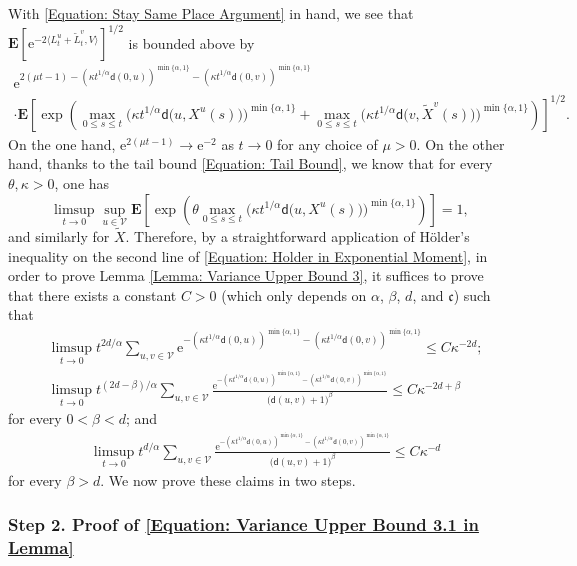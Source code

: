 \documentclass{amsart}
\numberwithin{equation}{section}
\theoremstyle{definition}
\newcommand\al{\alpha}
\newcommand\be{\beta}
\newcommand\ka{\kappa}
\newcommand\mbf{\mathbf}
\newcommand\mf{\mathfrak}
\newcommand\mr{\mathrm}
\newcommand\ms{\mathscr}
\newcommand\msf{\mathsf}
\begin{document}
%

With \eqref{Equation: Stay Same Place Argument} in hand, we see that $\mbf E[\mr e^{-2\langle L^u_t+\tilde L^v_t,V\rangle}]^{1/2}$
is bounded above by
\begin{multline}
\label{Equation: Holder in Exponential Moment}
\mr e^{2(\mu t-1)-(\ka t^{1/\al}\msf d(0,u))^{\min\{\al,1\}}-(\ka t^{1/\al}\msf d(0,v))^{\min\{\al,1\}}}\\
\cdot\mbf E\left[\exp\left(\max_{0\leq s\leq t}\Big(\ka t^{1/\al}\msf d\big(u,X^u(s)\big)\Big)^{\min\{\al,1\}}+\max_{0\leq s\leq t}\Big(\ka t^{1/\al}\msf d\big(v,\tilde X^v(s)\big)\Big)^{\min\{\al,1\}}\right)\right]^{1/2}.
\end{multline}
On the one hand, $\mr e^{2(\mu t-1)}\to\mr e^{-2}$ as $t\to0$ for any choice of $\mu>0$. On the other hand,
thanks to the tail bound \eqref{Equation: Tail Bound}, we know that for every $\theta,\ka>0$, one has
\[\limsup_{t\to0}\sup_{u\in\ms V}\mbf E\left[\exp\left(\theta\max_{0\leq s\leq t}\Big(\ka t^{1/\al}\msf d\big(u,X^u(s)\big)\Big)^{\min\{\al,1\}}\right)\right]=1,\]
and similarly for $\tilde X$. Therefore, by a straightforward application of H\"older's inequality
on the second line of \eqref{Equation: Holder in Exponential Moment}, in order to prove Lemma \ref{Lemma: Variance Upper Bound 3}, it suffices to prove that
there exists a constant $C>0$ (which only depends on $\al$, $\be$, $d$, and $\mf c$) such that
\begin{align}
\label{Equation: Variance Upper Bound 3.1 in Lemma}
&\limsup_{t\to0}t^{2d/\al}\sum_{u,v\in\ms V}
\mr e^{-(\ka t^{1/\al}\msf d(0,u))^{\min\{\al,1\}}-(\ka t^{1/\al}\msf d(0,v))^{\min\{\al,1\}}}
\leq C\ka^{-2d};\\
\label{Equation: Variance Upper Bound 3.2 in Lemma}
&\limsup_{t\to0}t^{(2d-\be)/\al}\sum_{u,v\in\ms V}
\frac{\mr e^{-(\ka t^{1/\al}\msf d(0,u))^{\min\{\al,1\}}-(\ka t^{1/\al}\msf d(0,v))^{\min\{\al,1\}}}}{\big(\msf d(u,v)+1\big)^{\be}}
\leq C\ka^{-2d+\be}
\end{align}
for every $0<\be<d$; and
\begin{align}
\label{Equation: Variance Upper Bound 3.3 in Lemma}
&\limsup_{t\to0}t^{d/\al}\sum_{u,v\in\ms V}
\frac{\mr e^{-(\ka t^{1/\al}\msf d(0,u))^{\min\{\al,1\}}-(\ka t^{1/\al}\msf d(0,v))^{\min\{\al,1\}}}}{\big(\msf d(u,v)+1\big)^{\be}}
\leq C\ka^{-d}
\end{align}
for every $\be>d$.
We now prove these claims in two steps.

%

\subsubsection{Step 2. Proof of \eqref{Equation: Variance Upper Bound 3.1 in Lemma}}
\label{Section: Proof of 3.1}
\end{document}
